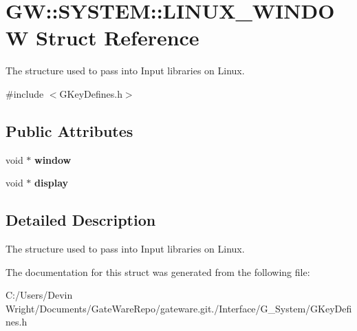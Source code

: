 \hypertarget{struct_g_w_1_1_s_y_s_t_e_m_1_1_l_i_n_u_x___w_i_n_d_o_w}{}\section{GW\+:\+:S\+Y\+S\+T\+EM\+:\+:L\+I\+N\+U\+X\+\_\+\+W\+I\+N\+D\+OW Struct Reference}
\label{struct_g_w_1_1_s_y_s_t_e_m_1_1_l_i_n_u_x___w_i_n_d_o_w}


The structure used to pass into Input libraries on Linux.  




{\ttfamily \#include $<$G\+Key\+Defines.\+h$>$}

\subsection*{Public Attributes}
\begin{DoxyCompactItemize}
\item 
\mbox{\label{struct_g_w_1_1_s_y_s_t_e_m_1_1_l_i_n_u_x___w_i_n_d_o_w_a9d4ffe1d048716af5f2d1fe3595b6b99}} 
void $\ast$ {\bfseries window}
\item 
\mbox{\label{struct_g_w_1_1_s_y_s_t_e_m_1_1_l_i_n_u_x___w_i_n_d_o_w_ae68b93065e8ebd9de010f42ccf688ac5}} 
void $\ast$ {\bfseries display}
\end{DoxyCompactItemize}


\subsection{Detailed Description}
The structure used to pass into Input libraries on Linux. 

The documentation for this struct was generated from the following file\+:\begin{DoxyCompactItemize}
\item 
C\+:/\+Users/\+Devin Wright/\+Documents/\+Gate\+Ware\+Repo/gateware.\+git./\+Interface/\+G\+\_\+\+System/G\+Key\+Defines.\+h\end{DoxyCompactItemize}
